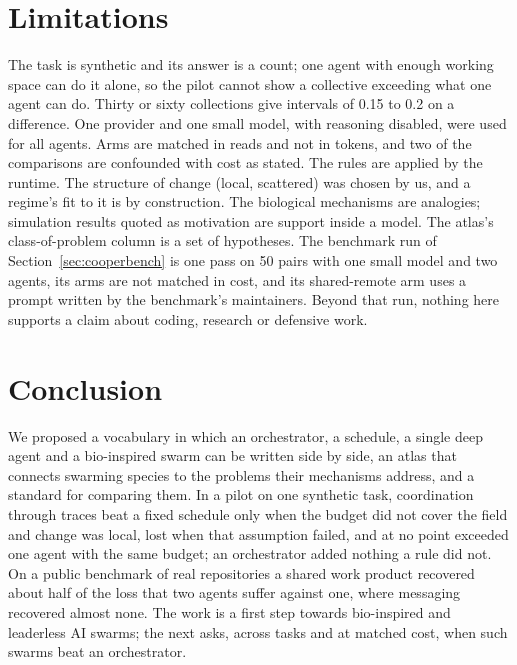 \documentclass[10pt,twocolumn]{article}
\begin{document}
\section{Limitations}

The task is synthetic and its answer is a count; one agent with enough working space can do it alone, so the pilot cannot show a collective exceeding what one agent can do. Thirty or sixty collections give intervals of 0.15 to 0.2 on a difference. One provider and one small model, with reasoning disabled, were used for all agents. Arms are matched in reads and not in tokens, and two of the comparisons are confounded with cost as stated. The rules are applied by the runtime. The structure of change (local, scattered) was chosen by us, and a regime's fit to it is by construction. The biological mechanisms are analogies; simulation results quoted as motivation are support inside a model. The atlas's class-of-problem column is a set of hypotheses. The benchmark run of Section~\ref{sec:cooperbench} is one pass on 50 pairs with one small model and two agents, its arms are not matched in cost, and its shared-remote arm uses a prompt written by the benchmark's maintainers. Beyond that run, nothing here supports a claim about coding, research or defensive work.

\section{Conclusion}

We proposed a vocabulary in which an orchestrator, a schedule, a single deep agent and a bio-inspired swarm can be written side by side, an atlas that connects swarming species to the problems their mechanisms address, and a standard for comparing them. In a pilot on one synthetic task, coordination through traces beat a fixed schedule only when the budget did not cover the field and change was local, lost when that assumption failed, and at no point exceeded one agent with the same budget; an orchestrator added nothing a rule did not. On a public benchmark of real repositories a shared work product recovered about half of the loss that two agents suffer against one, where messaging recovered almost none. The work is a first step towards bio-inspired and leaderless AI swarms; the next asks, across tasks and at matched cost, when such swarms beat an orchestrator.
\end{document}
